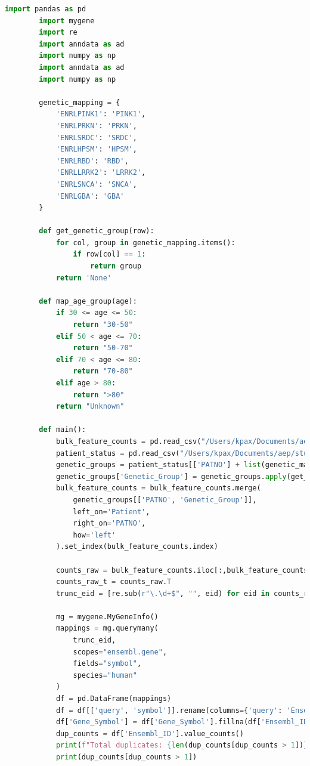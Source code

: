 \documentclass[12pt]{report}
\begin{document}
    \begin{lstlisting}[language=Python,caption={data\_consolidation.py: Συγχώνευση δεδομένων σε H5AD τύπο αρχείου}, label=lst:dataconsolidationpy]
        import pandas as pd
        import mygene
        import re
        import anndata as ad
        import numpy as np
        import anndata as ad
        import numpy as np
        
        genetic_mapping = {
            'ENRLPINK1': 'PINK1',
            'ENRLPRKN': 'PRKN',
            'ENRLSRDC': 'SRDC',
            'ENRLHPSM': 'HPSM',
            'ENRLRBD': 'RBD',
            'ENRLLRRK2': 'LRRK2',
            'ENRLSNCA': 'SNCA',
            'ENRLGBA': 'GBA'
        }
        
        def get_genetic_group(row):
            for col, group in genetic_mapping.items():
                if row[col] == 1:
                    return group
            return 'None'
        
        def map_age_group(age):
            if 30 <= age <= 50:
                return "30-50"
            elif 50 < age <= 70:
                return "50-70"
            elif 70 < age <= 80:
                return "70-80"
            elif age > 80:
                return ">80"
            return "Unknown"
        
        def main():
            bulk_feature_counts = pd.read_csv("/Users/kpax/Documents/aep/study/MSC/lab/PPMI_Project_133_RNASeq/ppmi_counts_meta_dataset.csv", index_col=0)
            patient_status = pd.read_csv("/Users/kpax/Documents/aep/study/MSC/lab/PPMI_Project_133_RNASeq/Participant_Status_19Mar2025.csv")
            genetic_groups = patient_status[['PATNO'] + list(genetic_mapping.keys())].copy()
            genetic_groups['Genetic_Group'] = genetic_groups.apply(get_genetic_group, axis=1)
            bulk_feature_counts = bulk_feature_counts.merge(
                genetic_groups[['PATNO', 'Genetic_Group']],
                left_on='Patient',
                right_on='PATNO',
                how='left'
            ).set_index(bulk_feature_counts.index)
        
            counts_raw = bulk_feature_counts.iloc[:,bulk_feature_counts.columns.str.startswith("ENSG")]
            counts_raw_t = counts_raw.T
            trunc_eid = [re.sub(r"\.\d+$", "", eid) for eid in counts_raw_t.index.values.tolist()]
        
            mg = mygene.MyGeneInfo()
            mappings = mg.querymany(
                trunc_eid,
                scopes="ensembl.gene",
                fields="symbol",
                species="human"
            )
            df = pd.DataFrame(mappings)
            df = df[['query', 'symbol']].rename(columns={'query': 'Ensembl_ID', 'symbol': 'Gene_Symbol'})
            df['Gene_Symbol'] = df['Gene_Symbol'].fillna(df['Ensembl_ID'])
            dup_counts = df['Ensembl_ID'].value_counts()
            print(f"Total duplicates: {len(dup_counts[dup_counts > 1])}")
            print(dup_counts[dup_counts > 1])
        

\end{lstlisting}
\end{document}

